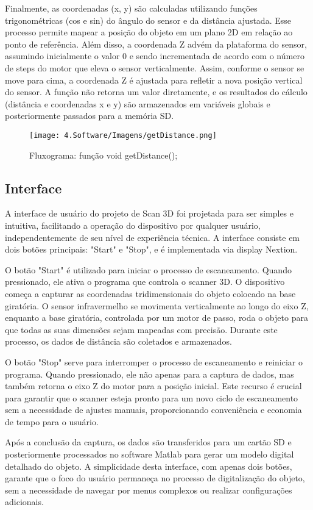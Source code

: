 Finalmente, as coordenadas (x, y) são calculadas utilizando funções trigonométricas (cos e sin) do ângulo do sensor e da distância ajustada. Esse processo permite mapear a posição do objeto em um plano 2D em relação ao ponto de referência. Além disso, a coordenada Z advém da plataforma do sensor, assumindo inicialmente o valor 0 e sendo incrementada de acordo com o número de steps do motor que eleva o sensor verticalmente. Assim, conforme o sensor se move para cima, a coordenada Z é ajustada para refletir a nova posição vertical do sensor. A função não retorna um valor diretamente, e os resultados do cálculo (distância e coordenadas x e y) são armazenados em variáveis globais e posteriormente passados para a memória SD.

\begin{figure}[H]
\captionsetup{width=0.6\textwidth}%
\caption{Fluxograma: função void getDistance();}%
\label{foto:getDistance}%
\texttt{[image: 4.Software/Imagens/getDistance.png]}%
\end{figure}

\subsection{Interface}

A interface de usuário do projeto de Scan 3D foi projetada para ser simples e intuitiva, facilitando a operação do dispositivo por qualquer usuário, independentemente de seu nível de experiência técnica. A interface consiste em dois botões principais: "Start" e "Stop", e é implementada via display Nextion.

O botão "Start" é utilizado para iniciar o processo de escaneamento. Quando pressionado, ele ativa o programa que controla o scanner 3D. O dispositivo começa a capturar as coordenadas tridimensionais do objeto colocado na base giratória. O sensor infravermelho se movimenta verticalmente ao longo do eixo Z, enquanto a base giratória, controlada por um motor de passo, roda o objeto para que todas as suas dimensões sejam mapeadas com precisão. Durante este processo, os dados de distância são coletados e armazenados.

O botão "Stop" serve para interromper o processo de escaneamento e reiniciar o programa. Quando pressionado, ele não apenas para a captura de dados, mas também retorna o eixo Z do motor para a posição inicial. Este recurso é crucial para garantir que o scanner esteja pronto para um novo ciclo de escaneamento sem a necessidade de ajustes manuais, proporcionando conveniência e economia de tempo para o usuário.

Após a conclusão da captura, os dados são transferidos para um cartão SD e posteriormente processados no software Matlab para gerar um modelo digital detalhado do objeto. A simplicidade desta interface, com apenas dois botões, garante que o foco do usuário permaneça no processo de digitalização do objeto, sem a necessidade de navegar por menus complexos ou realizar configurações adicionais.

